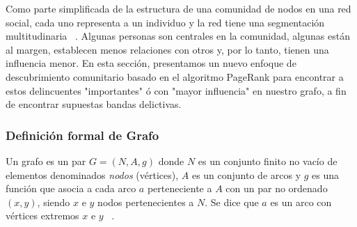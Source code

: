 Como parte simplificada de la estructura de una comunidad de nodos en una red social, cada uno representa a un individuo y la red tiene una segmentación multitudinaria ~\cite{ma2014exploring}. Algunas personas son centrales en la comunidad, algunas están al margen, establecen menos relaciones con otros y, por lo tanto, tienen una influencia menor. En esta sección, presentamos un nuevo enfoque de descubrimiento comunitario basado en el algoritmo PageRank para encontrar a estos delincuentes "importantes" ó con "mayor influencia" en nuestro grafo, a fin de encontrar supuestas bandas delictivas.

\subsubsection{Definición formal de Grafo}
Un grafo es un par $G = (N, A, g)$ donde $N$ es un conjunto finito no vacío de elementos denominados \textit{nodos} (vértices), $A$ es un conjunto de arcos y $g$ es una función que asocia a cada arco $a$ perteneciente a $A$ con un par no ordenado $(x, y)$, siendo $x$ e $y$ nodos pertenecientes a $N$. Se dice que $a$ es un arco con vértices extremos $x$ e $y$ ~\cite{dubinsky1984mathematical}.

